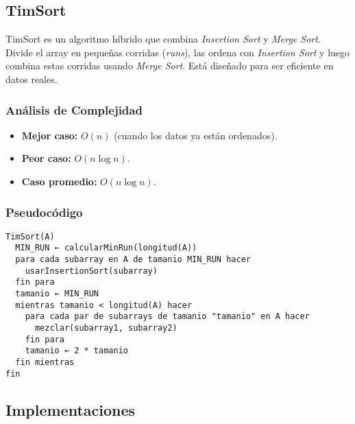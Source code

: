 \documentclass[11pt,openany]{book}
\begin{document}
\subsection{TimSort}
TimSort es un algoritmo híbrido que combina \textit{Insertion Sort} y \textit{Merge Sort}. Divide el array en pequeñas corridas (\textit{runs}), las ordena con \textit{Insertion Sort} y luego combina estas corridas usando \textit{Merge Sort}. Está diseñado para ser eficiente en datos reales.

\subsubsection{Análisis de Complejidad}
\begin{itemize}
    \item \textbf{Mejor caso:} $O(n)$ (cuando los datos ya están ordenados).
    \item \textbf{Peor caso:} $O(n \log n)$.
    \item \textbf{Caso promedio:} $O(n \log n)$.
\end{itemize}

\subsubsection{Pseudocódigo}
\begin{verbatim}
TimSort(A)
  MIN_RUN ← calcularMinRun(longitud(A))
  para cada subarray en A de tamanio MIN_RUN hacer
    usarInsertionSort(subarray)
  fin para
  tamanio ← MIN_RUN
  mientras tamanio < longitud(A) hacer
    para cada par de subarrays de tamanio "tamanio" en A hacer
      mezclar(subarray1, subarray2)
    fin para
    tamanio ← 2 * tamanio
  fin mientras
fin
\end{verbatim}

\subsection{Implementaciones}
\end{document}
